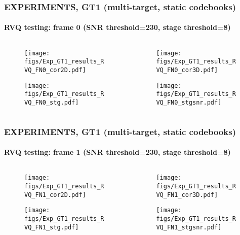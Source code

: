 \begin{frame}
\frametitle{\small EXPERIMENTS, GT1 (multi-target, static codebooks)}
\framesubtitle{RVQ testing: frame 0 (SNR threshold=230, stage threshold=8)}
	\begin{changemargin}{-1.35in}{0in}
	\begin{columns}
		\begin{column}{1.5in}
			\begin{figure}
				\texttt{[image: figs/Exp\_GT1\_results\_RVQ\_FN0\_cor2D.pdf]}
			\end{figure}			
			\begin{figure}
				\texttt{[image: figs/Exp\_GT1\_results\_RVQ\_FN0\_stg.pdf]}
			\end{figure}
		\end{column}
		\begin{column}{1.5in}
			\begin{figure}
				\texttt{[image: figs/Exp\_GT1\_results\_RVQ\_FN0\_cor3D.pdf]}
			\end{figure}
			\begin{figure}
				\texttt{[image: figs/Exp\_GT1\_results\_RVQ\_FN0\_stgsnr.pdf]}
			\end{figure}
		\end{column}
	\end{columns}
	\end{changemargin}
\end{frame}


\begin{frame}
\frametitle{\small EXPERIMENTS, GT1 (multi-target, static codebooks)}
\framesubtitle{RVQ testing: frame 1 (SNR threshold=230, stage threshold=8)}
	\begin{changemargin}{-1.35in}{0in}
	\begin{columns}
		\begin{column}{1.5in}
			\begin{figure}
				\texttt{[image: figs/Exp\_GT1\_results\_RVQ\_FN1\_cor2D.pdf]}
			\end{figure}			
			\begin{figure}
				\texttt{[image: figs/Exp\_GT1\_results\_RVQ\_FN1\_stg.pdf]}
			\end{figure}
		\end{column}
		\begin{column}{1.5in}
			\begin{figure}
				\texttt{[image: figs/Exp\_GT1\_results\_RVQ\_FN1\_cor3D.pdf]}
			\end{figure}
			\begin{figure}
				\texttt{[image: figs/Exp\_GT1\_results\_RVQ\_FN1\_stgsnr.pdf]}
			\end{figure}
		\end{column}
	\end{columns}
	\end{changemargin}
\end{frame}



